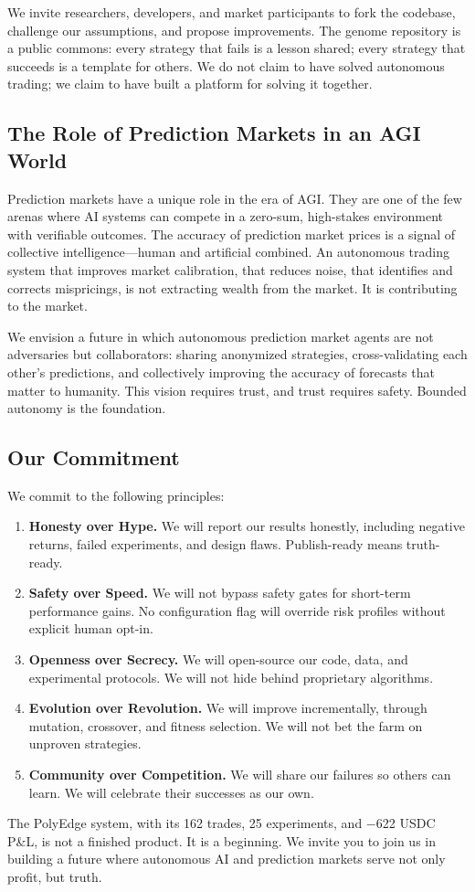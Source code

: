 We invite researchers, developers, and market participants to fork the codebase, challenge our assumptions, and propose improvements. The genome repository is a public commons: every strategy that fails is a lesson shared; every strategy that succeeds is a template for others. We do not claim to have solved autonomous trading; we claim to have built a platform for solving it together.

\subsection{The Role of Prediction Markets in an AGI World}

Prediction markets have a unique role in the era of AGI. They are one of the few arenas where AI systems can compete in a zero-sum, high-stakes environment with verifiable outcomes. The accuracy of prediction market prices is a signal of collective intelligence---human and artificial combined. An autonomous trading system that improves market calibration, that reduces noise, that identifies and corrects mispricings, is not extracting wealth from the market. It is contributing to the market.

We envision a future in which autonomous prediction market agents are not adversaries but collaborators: sharing anonymized strategies, cross-validating each other's predictions, and collectively improving the accuracy of forecasts that matter to humanity. This vision requires trust, and trust requires safety. Bounded autonomy is the foundation.

\subsection{Our Commitment}

We commit to the following principles:
\begin{enumerate}
    \item \textbf{Honesty over Hype.} We will report our results honestly, including negative returns, failed experiments, and design flaws. Publish-ready means truth-ready.
    \item \textbf{Safety over Speed.} We will not bypass safety gates for short-term performance gains. No configuration flag will override risk profiles without explicit human opt-in.
    \item \textbf{Openness over Secrecy.} We will open-source our code, data, and experimental protocols. We will not hide behind proprietary algorithms.
    \item \textbf{Evolution over Revolution.} We will improve incrementally, through mutation, crossover, and fitness selection. We will not bet the farm on unproven strategies.
    \item \textbf{Community over Competition.} We will share our failures so others can learn. We will celebrate their successes as our own.
\end{enumerate}

The PolyEdge system, with its 162 trades, 25 experiments, and $-$622 USDC P\&L, is not a finished product. It is a beginning. We invite you to join us in building a future where autonomous AI and prediction markets serve not only profit, but truth.
